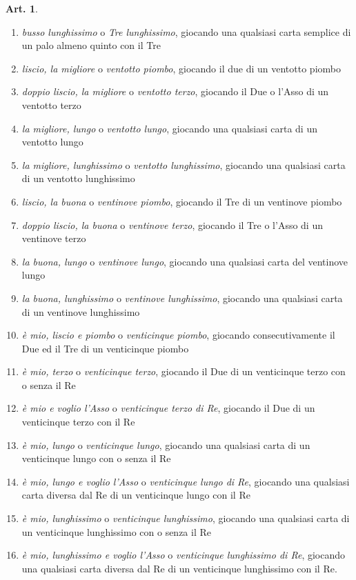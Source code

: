\documentclass[italian,a4paper]{book}
\theoremstyle{definition}
\newtheorem{art}{Art.}
\newenvironment{packedenum}{
\begin{enumerate}
  \setlength{\itemsep}{1pt}
  \setlength{\parskip}{0pt}
  \setlength{\parsep}{0pt}
}{\end{enumerate}}
\begin{document}
\begin{art}
\begin{packedenum}
\item      \emph{busso lunghissimo} o \emph{Tre lunghissimo}, giocando una qualsiasi carta
semplice di un palo almeno quinto con il Tre
\item      \emph{liscio, la migliore} o \emph{ventotto piombo}, giocando il due di un
ventotto piombo
\item      \emph{doppio liscio, la migliore} o \emph{ventotto terzo}, giocando il Due o
l’Asso di un ventotto terzo
\item      \emph{la migliore, lungo} o \emph{ventotto lungo}, giocando una qualsiasi carta
di un ventotto lungo
\item      \emph{la migliore, lunghissimo} o \emph{ventotto lunghissimo}, giocando una
qualsiasi carta di un ventotto lunghissimo
\item      \emph{liscio, la buona} o \emph{ventinove piombo}, giocando il Tre di un
ventinove piombo
\item      \emph{doppio liscio, la buona} o \emph{ventinove terzo}, giocando il Tre o
l’Asso di un ventinove terzo
\item      \emph{la buona, lungo} o \emph{ventinove lungo}, giocando una qualsiasi carta
del ventinove lungo
\item      \emph{la buona, lunghissimo} o \emph{ventinove lunghissimo}, giocando una
qualsiasi carta di un ventinove lunghissimo
\item      \emph{è mio, liscio e piombo} o \emph{venticinque piombo}, giocando
consecutivamente il Due ed il Tre di un venticinque piombo
\item      \emph{è mio, terzo} o \emph{venticinque terzo}, giocando il Due di un venticinque
terzo con o senza il Re
\item      \emph{è mio e voglio l’Asso} o \emph{venticinque terzo di Re}, giocando il Due
di un venticinque terzo con il Re
\item      \emph{è mio, lungo} o \emph{venticinque lungo}, giocando una qualsiasi carta di
un venticinque lungo con o senza il Re
\item      \emph{è mio, lungo e voglio l’Asso} o \emph{venticinque lungo di Re}, giocando
una qualsiasi carta diversa dal Re di un venticinque lungo con il Re
\item      \emph{è mio, lunghissimo} o \emph{venticinque lunghissimo}, giocando una
qualsiasi carta di un venticinque lunghissimo con o senza il Re
\item      \emph{è mio, lunghissimo e voglio l’Asso} o \emph{venticinque
    lunghissimo di Re}, giocando una qualsiasi carta diversa dal Re di un venticinque lunghissimo
con il Re.
\end{packedenum}
\end{art}
\end{document}
